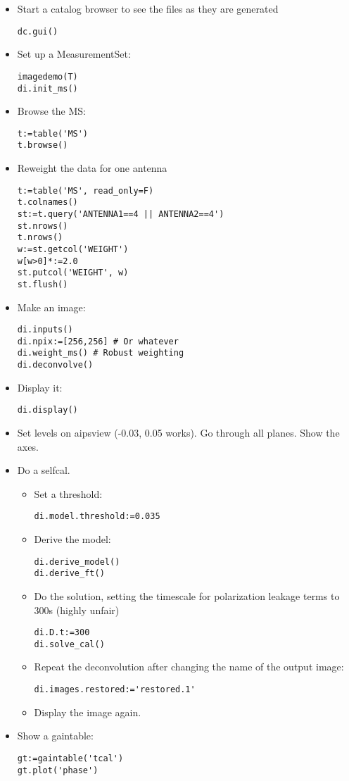 \begin{itemize}
\item Start a catalog browser to see the files as they are generated
\begin{verbatim}
dc.gui()
\end{verbatim}
\item Set up a MeasurementSet: 
\begin{verbatim}
imagedemo(T)
di.init_ms()
\end{verbatim}
\item Browse the MS: 
\begin{verbatim}
t:=table('MS')
t.browse()
\end{verbatim}
\item Reweight the data for one antenna
\begin{verbatim}
t:=table('MS', read_only=F)
t.colnames()
st:=t.query('ANTENNA1==4 || ANTENNA2==4')
st.nrows()
t.nrows()
w:=st.getcol('WEIGHT')
w[w>0]*:=2.0
st.putcol('WEIGHT', w)
st.flush()
\end{verbatim}
\item Make an image: 
\begin{verbatim}
di.inputs()
di.npix:=[256,256] # Or whatever
di.weight_ms() # Robust weighting
di.deconvolve()
\end{verbatim}
\item Display it:
\begin{verbatim}
di.display()
\end{verbatim}
\item Set levels on aipsview (-0.03, 0.05 works). Go through all planes. Show the axes.
\item Do a selfcal.
\begin{itemize}
\item Set a threshold: 
\begin{verbatim}
di.model.threshold:=0.035
\end{verbatim}
\item Derive the model: 
\begin{verbatim}
di.derive_model()
di.derive_ft()
\end{verbatim}
\item Do the solution, setting the timescale for polarization leakage
terms to 300s (highly unfair)
\begin{verbatim}
di.D.t:=300
di.solve_cal()
\end{verbatim}
\item Repeat the deconvolution after changing the name of the output
image: 
\begin{verbatim}
di.images.restored:='restored.1'
\end{verbatim}
\item Display the image again.
\end{itemize}
\item Show a gaintable:
\begin{verbatim}
gt:=gaintable('tcal')
gt.plot('phase')
\end{verbatim}
\end{itemize}

